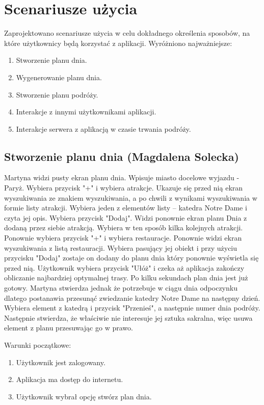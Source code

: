 \documentclass[10pt,twoside,a4paper]{report}
\begin{document}
\section{Scenariusze użycia}
\par Zaprojektowano scenariusze użycia w celu dokładnego określenia sposobów, na które użytkownicy będą korzystać z aplikacji. Wyróżniono najważniejsze:
\begin{enumerate}
  \item Stworzenie planu dnia.
  \item Wygenerowanie planu dnia.
  \item Stworzenie planu podróży.
  \item Interakcje z innymi użytkownikami aplikacji.
  \item Interakcje serwera z aplikacją w czasie trwania podróży.
\end{enumerate}

\subsection{Stworzenie planu dnia (Magdalena Solecka)}
\par Martyna widzi pusty ekran planu dnia. Wpisuje miasto docelowe wyjazdu - Paryż. Wybiera przycisk "+" i wybiera atrakcje. Ukazuje się przed nią ekran wyszukiwania ze znakiem wyszukiwania, a po chwili z wynikami wyszukiwania w formie listy atrakcji. Wybiera jeden z elementów listy – katedra Notre Dame i czyta jej opis. Wybiera przycisk "Dodaj". Widzi ponownie ekran planu Dnia z dodaną przez siebie atrakcją. Wybiera w ten sposób kilka kolejnych atrakcji. Ponownie wybiera przycisk "+" i wybiera restauracje. Ponownie widzi ekran wyszukiwania z listą restauracji. Wybiera pasujący jej obiekt i przy użyciu przycisku "Dodaj" zostaje on dodany do  planu dnia który ponownie wyświetla się przed nią. Użytkownik wybiera przycisk "Ułóż" i czeka aż aplikacja zakończy obliczanie najbardziej optymalnej trasy. Po kilku sekundach plan dnia jest już gotowy. Martyna stwierdza jednak że potrzebuje w ciągu dnia odpoczynku dlatego postanawia przesunąć zwiedzanie katedry Notre Dame na następny dzień. Wybiera element z katedrą i przycisk "Przenieś", a następnie numer dnia podróży. Następnie stwierdza, że właściwie nie interesuje jej sztuka sakralna, więc usuwa element z planu przesuwając go w prawo.

\noindent\newline Warunki początkowe:
\begin{enumerate}
  \item Użytkownik jest zalogowany.
  \item Aplikacja ma dostęp do internetu.
  \item Użytkownik wybrał opcję stwórz plan dnia.
\end{enumerate}
\end{document}
